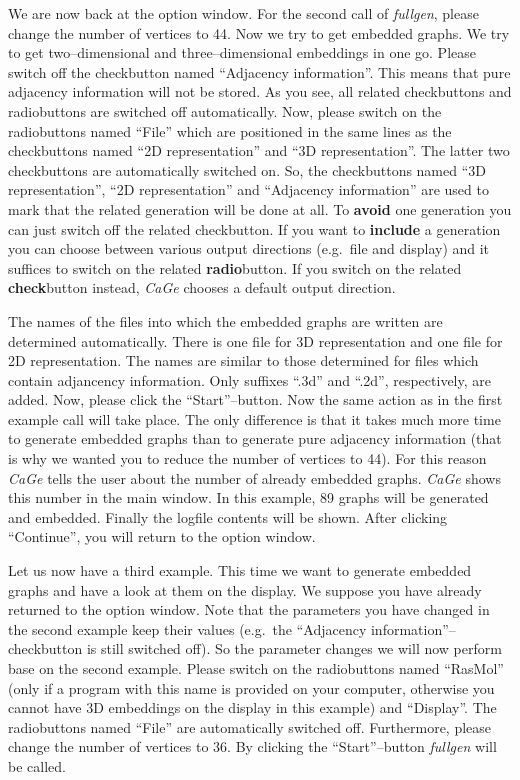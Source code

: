 \documentclass[a4paper]{article}
\def\CaGe{\textit{CaGe}}
\begin{document}
We are now back at the option window. For the second call of \textit{fullgen},
please change the number of vertices to 44. Now we try to get embedded graphs.
We try to get two--dimensional and three--dimensional embeddings in one go.
Please switch off the checkbutton named ``Adjacency information''. This means
that pure adjacency information will not be stored. As you see, all related 
checkbuttons and radiobuttons are switched off automatically. Now, please
switch on the radiobuttons named ``File'' which are positioned in the same 
lines as the checkbuttons named ``2D representation'' and 
``3D representation''. The latter two checkbuttons are automatically switched 
on. So, the checkbuttons named ``3D representation'', ``2D representation''
and ``Adjacency information'' are used to mark that the related generation
will be done at all. To \textbf{avoid} one generation you can just switch off
the related checkbutton. If you want to \textbf{include} a generation you can
choose between various output directions (e.g.~file and display) and it 
suffices to switch on the related \textbf{radio}button. If you switch on the
related \textbf{check}button instead, \CaGe{} chooses a default output 
direction.

The names of the files into which the embedded graphs are written are
determined automatically. There is one file for 3D representation and one 
file for 2D representation. The names are similar to those determined for
files which contain adjancency information. Only suffixes ``.3d'' and 
``.2d'', respectively, are added.
Now, please click the ``Start''--button. Now the same action as in the
first example call will take place. The only difference is that it takes much
more time to generate embedded graphs than to generate pure adjacency
information (that is why we wanted you to reduce the number of vertices
to 44). For this reason \CaGe{} tells the user about the number of already
embedded graphs. \CaGe{} shows this number in the main window.
In this example, 89 graphs will be generated and embedded. Finally the logfile
contents will be shown. After clicking ``Continue'', you will return to the
option window.

Let us now have a third example. This time we want to generate embedded graphs
and have a look at them on the display. We suppose you have already returned
to the option window. Note that the parameters you have changed in the second
example keep their values (e.g.~the ``Adjacency information''--checkbutton
is still switched off). So the parameter changes we will now perform base on
the second example. Please switch on the radiobuttons named ``RasMol'' (only
if a program with this name is provided on your computer, otherwise you cannot
have 3D embeddings on the display in this example) and
``Display''. The radiobuttons named ``File'' are automatically switched off.
Furthermore, please change the number of vertices to 36. By clicking the
``Start''--button \textit{fullgen} will be called.
\end{document}
